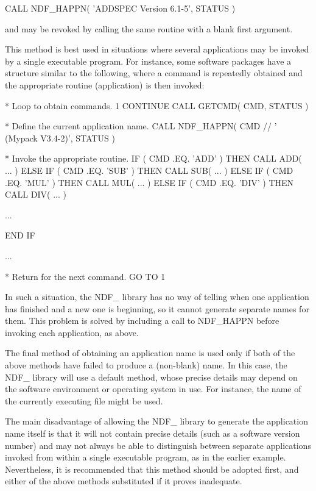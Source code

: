 \documentclass[twoside,11pt,nolof]{starlink}
\begin{document}
\small
\begin{terminalv}
      CALL NDF_HAPPN( 'ADDSPEC Version 6.1-5', STATUS )
\end{terminalv}
\normalsize

and may be revoked by calling the same routine with a blank first
argument.

This method is best used in situations where several applications may
be invoked by a single executable program. For instance, some software
packages have a structure similar to the following, where a command is
repeatedly obtained and the appropriate routine (application) is then
invoked:

\small
\begin{terminalv}
*  Loop to obtain commands.
 1    CONTINUE
      CALL GETCMD( CMD, STATUS )

*  Define the current application name.
      CALL NDF_HAPPN( CMD // ' (Mypack V3.4-2)', STATUS )

*  Invoke the appropriate routine.
      IF ( CMD .EQ. 'ADD' ) THEN
         CALL ADD( ... )
      ELSE IF ( CMD .EQ. 'SUB' ) THEN
         CALL SUB( ... )
      ELSE IF ( CMD .EQ. 'MUL' ) THEN
         CALL MUL( ... )
      ELSE IF ( CMD .EQ. 'DIV' ) THEN
         CALL DIV( ... )

      ...

      END IF

      ...

*  Return for the next command.
      GO TO 1
\end{terminalv}
\normalsize

In such a situation, the NDF\_ library has no way of telling when one
application has finished and a new one is beginning, so it cannot
generate separate names for them. This problem is solved by including
a call to NDF\_HAPPN before invoking each application, as above.

The final method of obtaining an application name is used only if both
of the above methods have failed to produce a (non-blank) name. In
this case, the NDF\_ library will use a default method, whose precise
details may depend on the software environment or operating system in
use. For instance, the name of the currently executing file might be
used.

The main disadvantage of allowing the NDF\_ library to generate the
application name itself is that it will not contain precise details
(such as a software version number) and may not always be able to
distinguish between separate applications invoked from within a single
executable program, as in the earlier example. Nevertheless, it is
recommended that this method should be adopted first, and either of
the above methods substituted if it proves inadequate.
\end{document}
